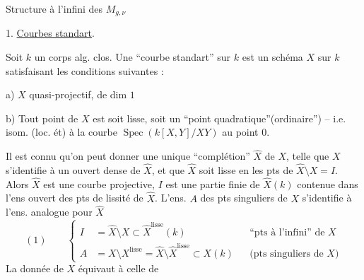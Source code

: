 Structure à l'infini des $M_{g,\nu}$

1. \uline{Courbes standart}.

Soit $k$ un corps alg. clos. Une ``courbe standart'' sur $k$ est un schéma $X$ sur $k$ satisfaisant les conditions suivantes :

a) $X$ quasi-projectif,  de dim $1$

b) Tout point de $X$ est soit lisse, soit un ``point quadratique''(ordinaire'') -- i.e. isom. (loc. ét) à la courbe $\operatorname{Spec}(k[X,Y]/XY)$ au point $0$.

Il est connu qu'on peut donner une unique ``complétion'' $\widehat X$ de $X$, telle que  $X$ s'identifie à un ouvert dense de $\widehat X$, et que $\widehat X$ soit lisse en les pts de $\widehat X\setminus X=I$. Alors $\widehat X$ est une courbe projective, $I$ est  une partie finie de $\widehat X(k)$ contenue dans l'ens ouvert des pts de lissité de $\widehat X$. L'ens. $A$ des pts singuliers de $X$ s'identifie à l'ens. analogue pour $\widehat X$
\[
(1)\qquad
\left\{\begin{aligned}
I&=\widehat X\setminus X\subset\widehat X^{\mathrm{lisse}}(k)
&&\text{``pts à l'infini'' de }X\\
A&=X\setminus X^{\mathrm{lisse}}=\widehat X\setminus\widehat X^{\mathrm{lisse}}\subset X(k)
&&\text{(pts singuliers de }X\text{)}
\end{aligned}\right.
\]
La donnée de $X$ équivaut à celle de

